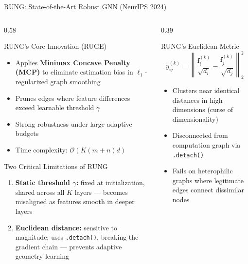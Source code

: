 \documentclass[aspectratio=169]{beamer}
\begin{document}
\begin{frame}{RUNG: State-of-the-Art Robust GNN (NeurIPS 2024)}
  \tiny
  \begin{columns}[T]
    \begin{column}{0.58\textwidth}
      \begin{block}{RUNG's Core Innovation (RUGE)}
        \begin{itemize}
          \item Applies \textbf{Minimax Concave Penalty (MCP)} to eliminate estimation bias in $\ell_1$-regularized graph smoothing
          \item Prunes edges where feature differences exceed learnable threshold $\gamma$
          \item Strong robustness under large adaptive budgets
          \item Time complexity: $\mathcal{O}(K(m+n)d)$
        \end{itemize}
      \end{block}
      \vspace{6pt}
      \begin{alertblock}{Two Critical Limitations of RUNG}
        \begin{enumerate}
          \item \textbf{Static threshold $\gamma$:} fixed at initialization, shared across all $K$ layers --- becomes misaligned as features smooth in deeper layers
          \item \textbf{Euclidean distance:} sensitive to magnitude; uses \texttt{.detach()}, breaking the gradient chain --- prevents adaptive geometry learning
        \end{enumerate}
      \end{alertblock}
    \end{column}
    \begin{column}{0.39\textwidth}
      \begin{block}{RUNG's Euclidean Metric}
        \[
          y^{(k)}_{ij} = \left\|\frac{\mathbf{f}^{(k)}_i}{\sqrt{d_i}} - \frac{\mathbf{f}^{(k)}_j}{\sqrt{d_j}}\right\|_2^2
        \]
        \small
        \vspace{4pt}
        \begin{itemize}
          \item Clusters near identical distances in high dimensions (curse of dimensionality)
          \item Disconnected from computation graph via \texttt{.detach()}
          \item Fails on heterophilic graphs where legitimate edges connect dissimilar nodes
        \end{itemize}
      \end{block}
    \end{column}
  \end{columns}
\end{frame}
\end{document}
